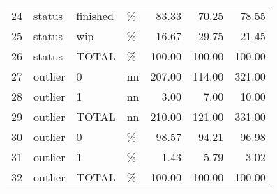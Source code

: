 \begin{sidewaystable}[ht]
\begin{tabular}{rlllrrr}
  24 & status & finished & \% & 83.33 & 70.25 & 78.55 \\ 
  25 & status & wip & \% & 16.67 & 29.75 & 21.45 \\ 
  26 & status & TOTAL & \% & 100.00 & 100.00 & 100.00 \\ 
  27 & outlier & 0 & nn & 207.00 & 114.00 & 321.00 \\ 
  28 & outlier & 1 & nn & 3.00 & 7.00 & 10.00 \\ 
  29 & outlier & TOTAL & nn & 210.00 & 121.00 & 331.00 \\ 
  30 & outlier & 0 & \% & 98.57 & 94.21 & 96.98 \\ 
  31 & outlier & 1 & \% & 1.43 & 5.79 & 3.02 \\ 
  32 & outlier & TOTAL & \% & 100.00 & 100.00 & 100.00 \\ 
   \hline
\end{tabular}
\end{sidewaystable}
